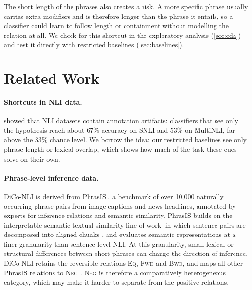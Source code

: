 \documentclass[11pt,a4paper]{article}
\newcommand{\EQ}{\textsc{Eq}}
\newcommand{\FWD}{\textsc{Fwd}}
\newcommand{\BWD}{\textsc{Bwd}}
\newcommand{\NEG}{\textsc{Neg}}
\begin{document}
The short length of the phrases also creates a risk. A more specific phrase usually carries extra modifiers and is therefore longer than the phrase it entails, so a classifier could learn to follow length or containment without modelling the relation at all. We check for this shortcut in the exploratory analysis (\cref{sec:eda}) and test it directly with restricted baselines (\cref{sec:baselines}).

\section{Related Work}
\label{sec:related}

\paragraph{Shortcuts in NLI data.}
\citet{gururangan2018annotation} showed that NLI datasets contain annotation artifacts: classifiers that see only the hypothesis reach about 67\% accuracy on SNLI and 53\% on MultiNLI, far above the 33\% chance level. We borrow the idea: our restricted baselines see only phrase length or lexical overlap, which shows how much of the task these cues solve on their own.

\paragraph{Phrase-level inference data.}
DiCo-NLI is derived from PhrasIS \citep{lopezgazpio2024phrasis}, a benchmark of over 10{,}000 naturally occurring phrase pairs from image captions and news headlines, annotated by experts for inference relations and semantic similarity. PhrasIS builds on the interpretable semantic textual similarity line of work, in which sentence pairs are decomposed into aligned chunks \citep{lopezgazpio2017interpretable}, and evaluates semantic representations at a finer granularity than sentence-level NLI. At this granularity, small lexical or structural differences between short phrases can change the direction of inference. DiCo-NLI retains the reversible relations \EQ, \FWD{} and \BWD, and maps all other PhrasIS relations to \NEG{} \citep{diconli2026}. \NEG{} is therefore a comparatively heterogeneous category, which may make it harder to separate from the positive relations.
\end{document}
